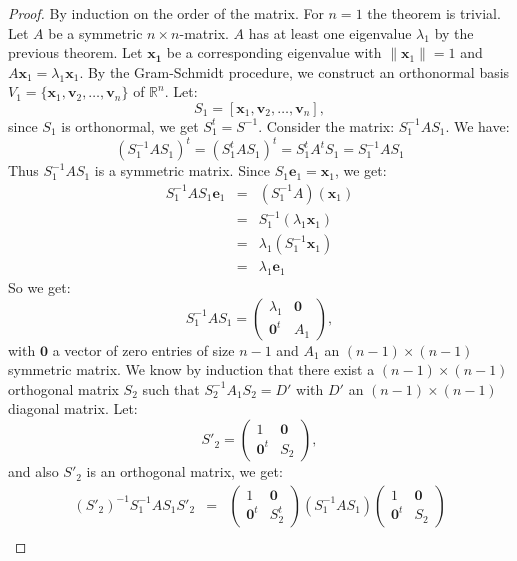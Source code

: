 \documentclass[a4paper,11pt]{report}
\newcommand{\R}{{\mathbb R}}
\begin{document}
 \begin{proof}
By induction on the order of the matrix. For $n=1$ the theorem is trivial. Let $A$ 
be a symmetric $n\times n$-matrix. $A$ has at least one eigenvalue $\lambda_1$ by the 
previous theorem. Let $\mathbf{x_1}$ be a corresponding eigenvalue with $\|\mathbf{x}_1\|=1$ 
and $A\mathbf{x}_1=\lambda_1\mathbf{x}_1$. By the Gram-Schmidt procedure, we construct an 
orthonormal basis $V_1 = \{\mathbf{x}_1, \mathbf{v}_2,\ldots,\mathbf{v}_n\}$ of 
$\R^n$.
Let:
$$S_1= [\mathbf{x}_1,\mathbf{v}_2,\ldots,\mathbf{v}_n],$$
since $S_1$ is orthonormal, we get $S^t_1 = S^{-1}$. Consider the matrix:
$S_1^{-1}AS_1$. We have:
$$(S_1^{-1}AS_1)^t = (S_1^{t}AS_1)^t = S_1^t A^t S_1 = S^{-1}_1AS_1$$
Thus $S_1^{-1}AS_1$ is a symmetric matrix. Since $S_1\mathbf{e}_1 = \mathbf{x}_1$, we get:
\begin{eqnarray*}
 S_1^{-1}AS_1\mathbf{e}_1 &=& (S_1^{-1} A)(\mathbf{x}_1)\\
 &=& S_1^{-1}(\lambda_1\mathbf{x}_1)\\
 &=& \lambda_1(S_1^{-1}\mathbf{x}_1)\\
 &=& \lambda_1 \mathbf{e}_1
\end{eqnarray*}
So we get:
$$S_1^{-1}AS_1=\left(
\begin{array}{c|c}
\lambda_1 & \mathbf{0} \\ \hline
\mathbf{0}^t & A_1
\end{array}\right),$$
with $\mathbf{0}$ a vector of zero entries of size $n-1$ and $A_1$ an $(n-1)\times(n-1)$ symmetric matrix. 
We know by induction that there exist a $(n-1)\times(n-1)$ orthogonal matrix $S_2$ such that 
$S_2^{-1}A_1S_2 = D'$ with $D'$ an  $(n-1)\times(n-1)$ diagonal matrix. Let:
$$S'_2=\left(
\begin{array}{c|c}
1 & \mathbf{0} \\ \hline
\mathbf{0}^t & S_2
\end{array}\right),$$
and also $S'_2$ is an orthogonal matrix, we get:
\begin{eqnarray*}
 \left(S'_2\right)^{-1}S_1^{-1}A S_1 S'_2 &=& \left(
\begin{array}{c|c}
1 & \mathbf{0} \\ \hline
\mathbf{0}^t & S^t_2
\end{array}\right) \left(S_1^{-1}A S_1\right) \left(
\begin{array}{c|c}
1 & \mathbf{0} \\ \hline
\mathbf{0}^t & S_2
\end{array}\right) \\

\end{eqnarray*}
\end{proof}
\end{document}
